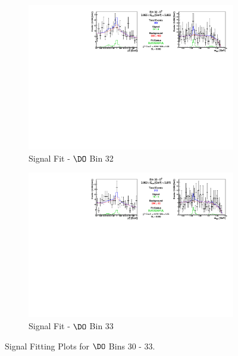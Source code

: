 \begin{figure}[h]
\begin{subfigure}[c]{0.99\textwidth}
\includegraphics[width=\textwidth]{figures/plots/fit_results/D0_bin_32.pdf}
\caption*{Signal Fit - $\DO$ Bin 32}
\end{subfigure}

\vspace{5pt}

\begin{subfigure}[c]{0.99\textwidth}
\includegraphics[width=\textwidth]{figures/plots/fit_results/D0_bin_33.pdf}
\caption*{Signal Fit - $\DO$ Bin 33}
\end{subfigure}

\caption{Signal Fitting Plots for $\DO$ Bins 30 - 33.}
\label{fig:DO_plots_30_33}

\end{figure}

